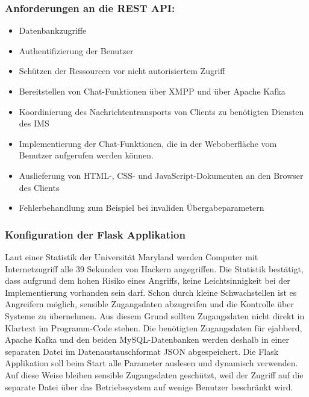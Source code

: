\documentclass[a4paper,titlepage,halfparskip,12pt]{scrreprt}
\begin{document}
\begin{onehalfspacing}
\subsubsection*{Anforderungen an die \acs{REST} \acs{API}:}

\begin{itemize}
\item Datenbankzugriffe
\item Authentifizierung der Benutzer
\item Schützen der Ressourcen vor nicht autorisiertem Zugriff
\item Bereitstellen von Chat-Funktionen über \ac{XMPP} und über Apache Kafka
\item Koordinierung des Nachrichtentransports von Clients zu benötigten Diensten des \ac{IMS}
\item Implementierung der Chat-Funktionen, die in der Weboberfläche vom Benutzer aufgerufen werden können.
\item Auslieferung von \ac{HTML}-, \ac{CSS}- und JavaScript-Dokumenten an den Browser des Clients
\item Fehlerbehandlung zum Beispiel bei invaliden Übergabeparametern
\end{itemize}


\subsubsection*{Konfiguration der Flask Applikation}

Laut einer Statistik der Universität Maryland \cite{securityStatisticWebSites} werden Computer mit Internetzugriff alle 39 Sekunden von Hackern angegriffen. Die Statistik bestätigt, dass aufgrund dem hohen Risiko eines Angriffs, keine Leichtsinnigkeit bei der Implementierung vorhanden sein darf. Schon durch kleine Schwachstellen ist es Angreifern möglich, sensible Zugangsdaten abzugreifen und die Kontrolle über Systeme zu übernehmen. Aus diesem Grund sollten Zugangsdaten nicht direkt in Klartext im Programm-Code stehen. Die benötigten Zugangsdaten für ejabberd, Apache Kafka und den beiden MySQL-Datenbanken werden deshalb in einer separaten Datei im Datenaustauschformat \acs{JSON} abgespeichert. Die Flask Applikation soll beim Start alle Parameter auslesen und dynamisch verwenden. Auf diese Weise bleiben sensible Zugangsdaten geschützt, weil der Zugriff auf die separate Datei über das Betriebssystem auf wenige Benutzer beschränkt wird.


\end{onehalfspacing}
\end{document}
